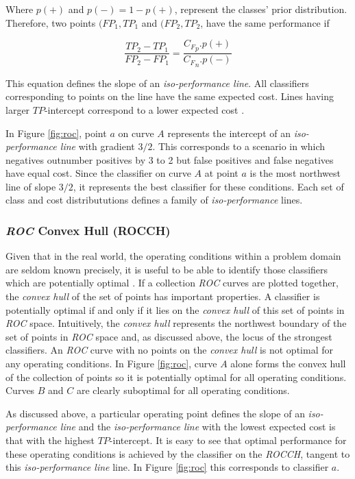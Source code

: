 \documentclass[10pt]{unbthesis}
\begin{document}
Where \(p(+)\) and \(p(-) = 1 - p(+)\), represent the classes' prior
distribution. Therefore, two points \((FP_1, TP_1\) and \((FP_2,
TP_2\), have the same performance if 

\begin{equation}
  \frac{TP_2 - TP_1}{FP_2 - FP_1} = \frac{{C_F}_p . p(+)}{{C_F}_n . p(-)}
\end{equation}

This equation defines the slope of an \textit{iso-performance
  line}. All classifiers corresponding to points on the line have the
same expected cost. Lines having larger \(TP\)-intercept correspond to
a lower expected cost \cite{RefWorks:61}.

In Figure \ref{fig:roc}, point \(a\) on curve \(A\) represents the
intercept of an \textit{iso-performance line} with gradient
\(3/2\). This corresponds to a scenario in which negatives outnumber
positives by 3 to 2 but false positives and false negatives have equal
cost. Since the classifier on curve \(A\) at point \(a\) is the most
northwest line of slope \(3/2\), it represents the best classifier for
these conditions. Each set of class and cost distribututions defines a
family of \textit{iso-performance} lines.


\subsubsection{\textit{ROC} Convex Hull (ROCCH)}
Given that in the real world, the operating conditions within a
problem domain are seldom known precisely, it is useful to be able to
identify those classifiers which are potentially optimal
\cite{RefWorks:61}. If a collection \textit{ROC} curves are plotted
together, the \textit{convex hull} of the set of points has important
properties. A classifier is potentially optimal if and only if it lies
on the \textit{convex hull} of this set of points in \textit{ROC}
space. Intuitively, the \textit{convex hull} represents the northwest
boundary of the set of points in \textit{ROC} space and, as discussed
above, the locus of the strongest classifiers. An \textit{ROC} curve
with no points on the \textit{convex hull} is not optimal for any
operating conditions. In Figure \ref{fig:roc}, curve \(A\) alone forms
the convex hull of the collection of points so it is potentially
optimal for all operating conditions. Curves \(B\) and \(C\) are
clearly suboptimal for all operating conditions.

As discussed above, a particular operating point defines the slope of
an \textit{iso-performance line} and the \textit{iso-performance line}
with the lowest expected cost is that with the highest
\(TP\)-intercept. It is easy to see that optimal performance for these
operating conditions is achieved by the classifier on the
\textit{ROCCH}, tangent to this \textit{iso-performance line} line. In
Figure \ref{fig:roc} this corresponds to classifier \(a\).
\end{document}
